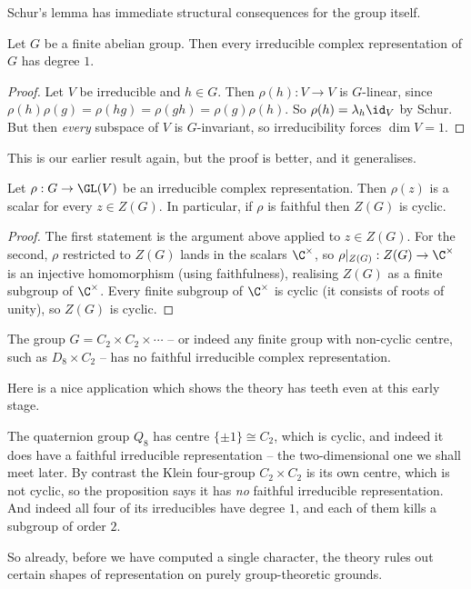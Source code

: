 Schur's lemma has immediate structural consequences for the group itself.

\begin{corollary}
	Let $G$ be a finite abelian group. Then every irreducible complex representation of $G$ has degree $1$.
\end{corollary}
\begin{proof}
	Let $V$ be irreducible and $h \in G$. Then $\rho(h) : V \to V$ is $G$-linear, since $\rho(h)\rho(g) = \rho(hg) = \rho(gh) = \rho(g)\rho(h)$. So $\rho(h) = \lambda_h \id_V$ by Schur. But then \emph{every} subspace of $V$ is $G$-invariant, so irreducibility forces $\dim V = 1$.
\end{proof}

This is our earlier result again, but the proof is better, and it generalises.

\begin{proposition}
	Let $\rho: G \to \GL(V)$ be an irreducible complex representation. Then $\rho(z)$ is a scalar for every $z \in Z(G)$. In particular, if $\rho$ is faithful then $Z(G)$ is cyclic.
\end{proposition}
\begin{proof}
	The first statement is the argument above applied to $z \in Z(G)$. For the second, $\rho$ restricted to $Z(G)$ lands in the scalars $\C^\times$, so $\rho|_{Z(G)} : Z(G) \to \C^\times$ is an injective homomorphism (using faithfulness), realising $Z(G)$ as a finite subgroup of $\C^\times$. Every finite subgroup of $\C^\times$ is cyclic (it consists of roots of unity), so $Z(G)$ is cyclic.
\end{proof}

\begin{corollary}
	The group $G = C_2 \times C_2 \times \cdots$ -- or indeed any finite group with non-cyclic centre, such as $D_8 \times C_2$ -- has no faithful irreducible complex representation.
\end{corollary}

Here is a nice application which shows the theory has teeth even at this early stage.

\begin{example}
	The quaternion group $Q_8$ has centre $\{\pm1\}\cong C_2$, which is cyclic, and indeed it does have a faithful irreducible representation -- the two-dimensional one we shall meet later. By contrast the Klein four-group $C_2\times C_2$ is its own centre, which is not cyclic, so the proposition says it has \emph{no} faithful irreducible representation. And indeed all four of its irreducibles have degree $1$, and each of them kills a subgroup of order $2$.

	So already, before we have computed a single character, the theory rules out certain shapes of representation on purely group-theoretic grounds.
\end{example}

